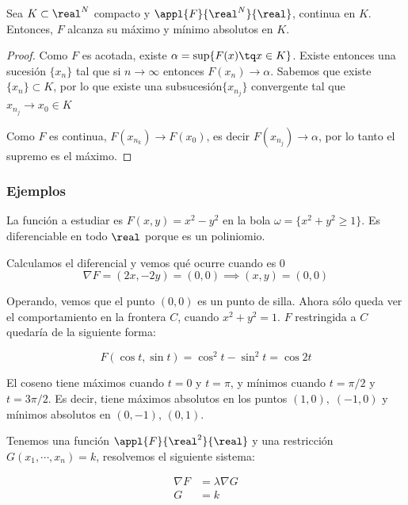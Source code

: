 \documentclass[nochap]{apuntes}
\begin{document}
\begin{theorem}
Sea $K\subset \real^N$ compacto y $\appl{F}{\real^N}{\real}$, continua en $K$. Entonces, $F$ alcanza su máximo y mínimo absolutos en $K$.
\end{theorem}

\begin{proof}

Como $F$ es acotada, existe $\alpha = \sup \{ F(x) \tq x \in K\}$. Existe entonces una sucesión $\{x_n\}$ tal que si $n\to \infty$ entonces $F(x_n)\to \alpha$. 
Sabemos que existe $\{x_n\}\subset K$, por lo que existe una subsucesión$\{x_{n_j}\}$ convergente tal que $x_{n_j} \to x_0 \in K$

Como $F$ es continua, $F(x_{n_k})\to F(x_0)$, es decir $F(x_{n_j}) \to \alpha$, por lo tanto el supremo es el máximo.
\end{proof}

\subsubsection{Ejemplos}

La función a estudiar es $F(x,y) = x^2-y^2$ en la bola $\omega = \{ x^2 + y ^2 ≥ 1\}$. Es diferenciable en todo $\real$ porque es un poliniomio. 

Calculamos el diferencial y vemos qué ocurre cuando es 0 \[\nabla F = (2x, -2y) = (0,0) \implies (x,y) = (0,0)\]

Operando, vemos que el punto $(0,0)$ es un punto de silla. Ahora sólo queda ver el comportamiento en la frontera $C$, cuando $x^2+y^2 = 1$. $F$ restringida a $C$ quedaría de la siguiente forma:

\[ F(\cos t, \sin t) = \cos^2 t - \sin^2 t = \cos 2t\]

El coseno tiene máximos cuando $t=0$ y $t=\pi$, y mínimos cuando $t=\pi /2$ y $t=3\pi /2$. Es decir, tiene máximos absolutos en los puntos $(1,0),\;(-1,0)$ y mínimos absolutos en $(0, -1)$, $(0, 1)$. 

\begin{theorem}
Tenemos una función $\appl{F}{\real^2}{\real}$ y una restricción $G(x_1,\cdots,x_n) = k$, resolvemos el siguiente sistema:

\begin{align*}
\nabla F &= \lambda \nabla G \\
G &= k
\end{align*} 

\end{theorem}
\end{document}
